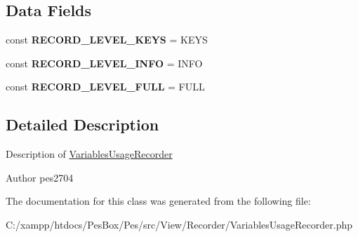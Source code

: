 \subsection*{Data Fields}
\begin{DoxyCompactItemize}
\item 
\mbox{\label{class_pes_1_1_view_1_1_recorder_1_1_variables_usage_recorder_a7d1b38e6220a420ebc98e7243c5b41d5}} 
const {\bfseries R\+E\+C\+O\+R\+D\+\_\+\+L\+E\+V\+E\+L\+\_\+\+K\+E\+YS} = \textquotesingle{}K\+E\+YS\textquotesingle{}
\item 
\mbox{\label{class_pes_1_1_view_1_1_recorder_1_1_variables_usage_recorder_a0a5d3cfb36b76d3508f0e813394fadb7}} 
const {\bfseries R\+E\+C\+O\+R\+D\+\_\+\+L\+E\+V\+E\+L\+\_\+\+I\+N\+FO} = \textquotesingle{}I\+N\+FO\textquotesingle{}
\item 
\mbox{\label{class_pes_1_1_view_1_1_recorder_1_1_variables_usage_recorder_a78affe6d956316fc283f488e6e4b7e72}} 
const {\bfseries R\+E\+C\+O\+R\+D\+\_\+\+L\+E\+V\+E\+L\+\_\+\+F\+U\+LL} = \textquotesingle{}F\+U\+LL\textquotesingle{}
\end{DoxyCompactItemize}


\subsection{Detailed Description}
Description of \mbox{\hyperlink{class_pes_1_1_view_1_1_recorder_1_1_variables_usage_recorder}{Variables\+Usage\+Recorder}}

\begin{DoxyAuthor}{Author}
pes2704 
\end{DoxyAuthor}


The documentation for this class was generated from the following file\+:\begin{DoxyCompactItemize}
\item 
C\+:/xampp/htdocs/\+Pes\+Box/\+Pes/src/\+View/\+Recorder/Variables\+Usage\+Recorder.\+php\end{DoxyCompactItemize}
